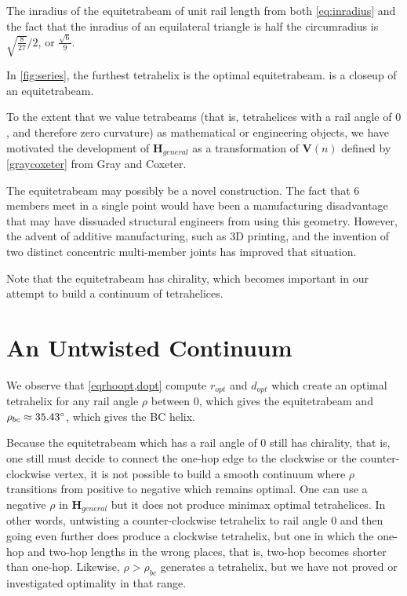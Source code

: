 \documentclass[twocolumn,10pt]{asme2ej}
\renewcommand{\vec}[1]{\mathbf{#1}}
\begin{document}
The inradius of the equitetrabeam of unit
rail length from both  \cref{eq:inradius} and the fact that the inradius of
an equilateral triangle is half the circumradius is $\sqrt{\frac{8}{27}}/2$, or $\frac{\sqrt{6}}{9}$.


In \cref{fig:series}, the furthest tetrahelix is the optimal equitetrabeam.
 is a closeup of an equitetrabeam.

To the extent that we value tetrabeams (that is, tetrahelices with a rail angle of $0$,
and therefore zero curvature) as mathematical or engineering objects,
we have motivated the development of $\vec{H}_{general}$ as a transformation of $\vec{V}(n)$ defined by
\cref{graycoxeter} from Gray and Coxeter.


The equitetrabeam may possibly be a novel construction.
The fact that 6 members meet in a single point would have been a manufacturing disadvantage that
may have dissuaded structural engineers from using this geometry.
However, the advent of additive manufacturing, such as 3D printing, and the invention of two
distinct concentric multi-member joints\cite{song2003spherical,HamlinSandersonCMS} has improved that situation.

Note that the equitetrabeam has chirality, which becomes important in our attempt to build a
continuum of tetrahelices.

\section{An Untwisted Continuum}
\label{sec:continuum}


We observe that  \cref{eqrhoopt,dopt} compute $r_{opt}$ and $d_{opt}$ which
create an optimal tetrahelix for any rail angle $\rho$ between $0$, which
gives the equitetrabeam and
$\rho_{bc} \approx 35.43 \degree$, which gives the BC helix.

 Because the equitetrabeam which has a rail angle of $0$ still has
 chirality, that is, one still must decide to connect the one-hop edge to
 the clockwise or the counter-clockwise vertex, it is not possible to build
 a smooth continuum where $\rho$ transitions from positive to negative
 which remains optimal. One can use a negative $\rho$ in $\vec{H}_{general}$
 but it does not produce minimax optimal tetrahelices. In other words,
 untwisting a counter-clockwise tetrahelix to rail angle $0$ and then going
even further does produce a clockwise tetrahelix, but one in which the
 one-hop and two-hop lengths in the wrong places, that is, two-hop
 becomes shorter than one-hop.
 Likewise, $\rho > \rho_{bc}$ generates
 a tetrahelix, but we have not proved or investigated optimality in that range.
 
\end{document}
